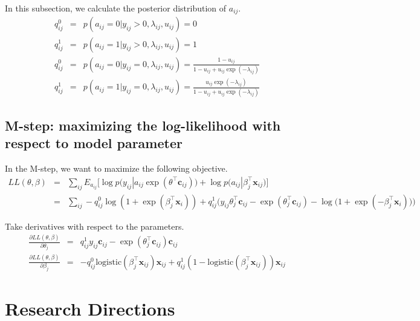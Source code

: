 \documentclass{article}
\begin{document}
In this subsection, we calculate the posterior distribution of $a_{ij}$.
\begin{eqnarray}
q_{ij}^{0} &=& p(a_{ij} = 0 | y_{ij} > 0, \lambda_{ij}, u_{ij}) =  0 \\
q_{ij}^{1} &=& p(a_{ij} = 1 | y_{ij} > 0, \lambda_{ij}, u_{ij}) =  1 \\[10pt]
q_{ij}^{0} &=& p(a_{ij} = 0 | y_{ij} = 0, \lambda_{ij}, u_{ij}) =  \frac{1 - u_{ij}}{1 - u_{ij} + u_{ij}\exp(-\lambda_{ij})} \\
q_{ij}^{1} &=& p(a_{ij} = 1 | y_{ij} = 0, \lambda_{ij}, u_{ij}) =  \frac{u_{ij}\exp(-\lambda_{ij})}{1 - u_{ij} + u_{ij}\exp(-\lambda_{ij})}
\end{eqnarray}


\subsection{M-step: maximizing the log-likelihood with respect to model parameter}

In the M-step, we want to maximize the following objective. 
\begin{eqnarray}
LL(\theta, \beta) &=& \sum_{ij} E_{a_{ij}} \Big[\log p\big(y_{ij} | a_{ij} \exp(\theta^\top \mathbf{c}_{ij})\big) + \log p\big(a_{ij} | \beta_j^\top \mathbf{x}_{ij}\big)\Big] \nonumber\\
&=& \sum_{ij}  - q_{ij}^0 \log (1 +  \exp(\beta_j^\top \mathbf{x}_i)) + q_{ij}^1 \Big( y_{ij}\theta_{j}^\top \mathbf{c}_{ij} - \exp(\theta_{j}^\top \mathbf{c}_{ij}) - \log \big(1 + \exp( - \beta_j^\top \mathbf{x}_i) \big) \Big) \nonumber
\end{eqnarray}

Take derivatives with respect to the parameters. 
\begin{eqnarray}
\frac{\partial LL(\theta, \beta)}{\partial \theta_j} &=& q_{ij}^1 y_{ij} \mathbf{c}_{ij} - \exp(
\theta_j^\top \mathbf{c}_{ij}) \mathbf{c}_{ij} \\
\frac{\partial LL(\theta, \beta)}{\partial \beta_j} &=& - q_{ij}^0 \mathrm{logistic}(\beta_j^\top \mathbf{x}_{ij}) \mathbf{x}_{ij} + q_{ij}^1 (1 - \mathrm{logistic}(\beta_j^\top \mathbf{x}_{ij})) \mathbf{x}_{ij}
\end{eqnarray}



\section{Research Directions}
\end{document}
